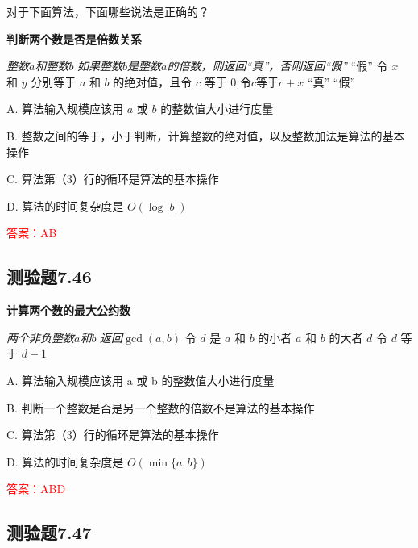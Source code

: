 \documentclass[UTF8, heading=true]{ctexart}
\begin{document}
对于下面算法，下面哪些说法是正确的？

\begin{algorithm}
  \caption{\textbf{判断两个数是否是倍数关系}}
  \begin{algorithmic}[1]
      \Require \textit{整数$a$和整数$b$}
      \Ensure \textit{如果整数$b$是整数$a$的倍数，则返回“真”，否则返回“假”}
       \Return “假” 
      \EndIf
      \State 令 $x$ 和 $y$ 分别等于 $a$ 和 $b$ 的绝对值，且令 $c$ 等于 0\;
       令$c$等于$c+x$
      \EndWhile
       \Return “真”
      \Else 
      \State \Return “假”\;
      \EndIf
  \end{algorithmic}
\end{algorithm}

A. 算法输入规模应该用 $a$ 或 $b$ 的整数值大小进行度量

B. 整数之间的等于，小于判断，计算整数的绝对值，以及整数加法是算法的基本操作

C. 算法第（3）行的循环是算法的基本操作

D. 算法的时间复杂度是 $O(\log |b|)$

\textcolor{red}{答案：AB}

\subsection{测验题7.46}

\begin{algorithm}
  \caption{\textbf{计算两个数的最大公约数}}
  \begin{algorithmic}[1]
      \Require \textit{两个非负整数$a$和$b$}
      \Ensure \textit{返回$\operatorname{gcd}(a, b)$}
      \State 令 $d$ 是 $a$ 和 $b$ 的小者
          \State \Return $a$ 和 $b$ 的大者
      \EndIf
              \State \Return $d$
          \EndIf
          \State 令 $d$ 等于 $d - 1$
      \EndWhile
  \end{algorithmic}
\end{algorithm}

A. 算法输入规模应该用 a 或 b 的整数值大小进行度量

B. 
判断一个整数是否是另一个整数的倍数不是算法的基本操作

C. 
算法第（3）行的循环是算法的基本操作

D. 
算法的时间复杂度是 $O(\min \{a, b\})$

\textcolor{red}{答案：ABD}

\subsection{测验题7.47}
\end{document}
